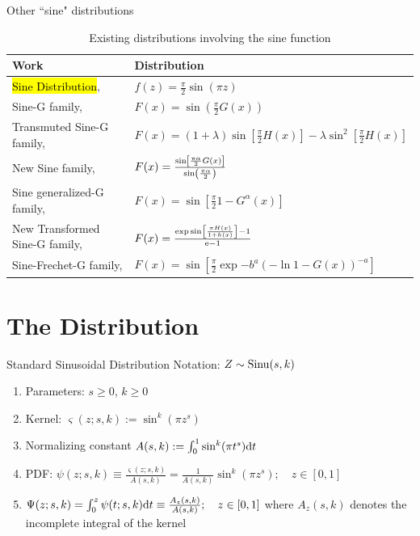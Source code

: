 \documentclass{beamer}
\begin{document}
\begin{frame}{Other ``sine" distributions}
    \begin{table}[h]
        \centering
        \begin{tabularx}{\textwidth}{X|X}
            \bfseries Work & \bfseries Distribution \\
            \hline
            \hl{Sine Distribution}, \cite{gilbert1893moon} & $f(z) = \frac{\pi}{2} \sin(\pi z)$ \\
            Sine-G family, \cite{kumar2015bladder} & $F(x) = \sin \left(\frac{\pi}{2} G(x) \right)$ \\
            Transmuted Sine-G family, \cite{sakthivel2021transmuted} & $F(x) = (1+\lambda)\sin \left[\frac{\pi}{2} H(x)\right] - \lambda \sin^2 \left[\frac{\pi}{2}H(x)\right]$\\
            New Sine family, \cite{benchiha2023newsineg} & $F(x) = \frac{\sin \left[\frac{\pi \alpha}{2} G(x)\right]}{\sin \left( \frac{\pi \alpha}{2} \right)}$ \\
            Sine generalized-G family, \cite{oramulu2024sinegen} & $F(x) = \sin \left[\frac{\pi}{2} {1-G^\alpha(x)}\right]$\\
            New Transformed Sine-G family, \cite{osi2025ntsg} & $F(x) = \frac{\exp \sin \left[ \frac{\pi H(x)}{1+h(x)} \right] - 1}{\mathrm e - 1}$\\
            Sine-Frechet-G family, \cite{jerry2026frechet} & $F(x) = \sin \left[\frac \pi 2 \exp{-b^a (-\ln{1-G(x)})^{-a}}\right]$
        \end{tabularx}
        \caption{Existing distributions involving the sine function}
        \label{tab:othersines}
    \end{table}
\end{frame}

\section{The Distribution}
\begin{frame}{Standard Sinusoidal Distribution}
Notation: $Z \sim \mathrm{Sinu}(s,k)$
\begin{enumerate}
    \item Parameters: $s \ge 0$, $k\ge 0$
    \item Kernel: $\varsigma(z; s,k) := \sin^k(\pi z^s)$
    \item Normalizing constant $A(s,k) := \int_0^1 \sin^k(\pi t^s) \mathrm d t$
    \item PDF: $\psi(z; s,k) \equiv \frac{\varsigma(z; s,k)}{A(s,k)} = \frac{1}{A(s,k)} \sin^k(\pi z^s); \quad z \in [0,1]$
    \item $\Psi(z; s,k) = \int_0^z \psi(t; s,k) \mathrm d t \equiv \frac{A_z(s,k)}{A(s,k)}; \quad z\in[0,1]$ where $A_z(s,k)$ denotes the incomplete integral of the kernel
    
\end{enumerate}
\end{frame}
\end{document}
